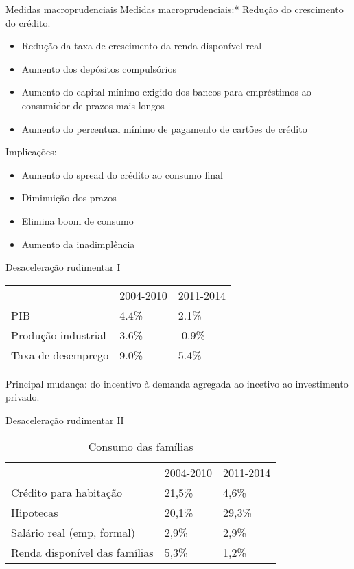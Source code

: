 \documentclass[presentation]{beamer}
\begin{document}
\begin{frame}[label={sec:orgc28458a}]{Medidas macroprudenciais}
\alert{Medidas macroprudenciais:*} Redução do crescimento do crédito.

\begin{itemize}
\item Redução da taxa de crescimento da renda disponível real
\item Aumento dos depósitos compulsórios
\item Aumento do capital mínimo exigido dos bancos para empréstimos ao consumidor de prazos mais longos
\item Aumento do percentual mínimo de pagamento de cartões de crédito
\end{itemize}

\alert{\alert{Implicações:}}

\begin{itemize}
\item Aumento do spread do crédito ao consumo final
\item Diminuição dos prazos
\item Elimina \alert{boom} de consumo
\item Aumento da inadimplência
\end{itemize}
\end{frame}


\begin{frame}[label={sec:orgcc09baa}]{Desaceleração rudimentar I}
\begin{center}
\begin{tabular}{lll}
\hline
 & 2004-2010 & 2011-2014\\
PIB & 4.4\% & 2.1\%\\
Produção industrial & 3.6\% & -0.9\%\\
Taxa de desemprego & 9.0\% & 5.4\%\\
\hline
\end{tabular}
\end{center}

\alert{Principal mudança:} do incentivo à demanda agregada ao incetivo ao investimento privado.
\end{frame}

\begin{frame}[label={sec:orgcd9deb4}]{Desaceleração rudimentar II}
\begin{table}[htbp]
\caption{Consumo das famílias}
\centering
\begin{tabular}{lll}
\hline
 & 2004-2010 & 2011-2014\\
Crédito para habitação & 21,5\% & 4,6\%\\
Hipotecas & 20,1\% & 29,3\%\\
Salário real (emp, formal) & 2,9\% & 2,9\%\\
Renda disponível das famílias & 5,3\% & 1,2\%\\
\hline
\end{tabular}
\end{table}
\end{frame}
\end{document}
